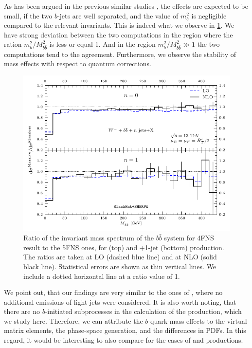 As has been argued in the previous similar studies \cite{FebresCordero:2006sj},
the effects are expected to be small, if the two $b$-jets are well separated,
and the value of $m_b^2$ is negligible compared to the relevant invariants.
This is indeed what we observe in \cref{fig:ratWmmbb}.
We have strong deviation between the two computations in the region where the ration $m_b^2/M_{b\bar{b}}^2$ 
is less or equal 1. And in the region $m_b^2/M_{b\bar{b}}^2\gg 1$ the two computations tend to the agreement.
Furthermore, we observe the stability of mass effects with respect to quantum corrections. 


\begin{figure}[ht]
  \centering
  \includegraphics[clip,scale=1.0]{plots/crmbb}
  \caption{Ratio of the invariant mass spectrum of the $b\bar b$ system for 4FNS
    result to the 5FNS ones, for \Wbbm{} (top) and \Wbbm+1-jet (bottom) production.
    The ratios are taken at LO (dashed blue line) and at NLO (solid black line).
    Statistical errors are shown as thin vertical lines. We include a dotted
  horizontal line at a ratio value of 1.}
  \label{fig:ratWmmbb}
\end{figure}

We point out, that our findings are very similar to the ones of \cite{FebresCordero:2006sj},
where no additional emissions of light jets were considered.
It is also worth noting, that
there are no $b$-initiated subprocesses in the calculation  of the \Wbbnj[1]{} production,
which we study here.
Therefore, we can attribute the $b$-quark-mass effects to the virtual matrix elements,
the phase-space generation, and the differences in PDFs.
In this regard, it would be interesting to also compare for the cases of \Wbbjj{} and \Wbbjjj{}
productions.

